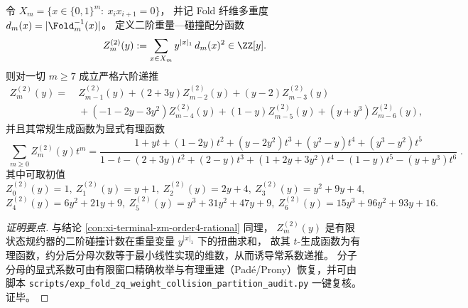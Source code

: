 
\begin{conclusion}[\texorpdfstring{$(q=2)$}{(q=2)} 的重量—碰撞配分函数：六阶常系数递推与有理生成函数]\label{con:xi-terminal-zm2-order6-rational}
令
\(
X_m=\{x\in\{0,1\}^m:\ x_ix_{i+1}=0\}
\)，
并记 Fold 纤维多重度 \(d_m(x)=|\Fold_m^{-1}(x)|\)。
定义二阶重量—碰撞配分函数
\[
Z_m^{(2)}(y):=\sum_{x\in X_m} y^{|x|_1}\,d_m(x)^2\in\ZZ[y].
\]
则对一切 \(m\ge 7\) 成立严格六阶递推
\[
\begin{aligned}
Z_m^{(2)}(y)=&\ Z_{m-1}^{(2)}(y)+(2+3y)Z_{m-2}^{(2)}(y)+(y-2)Z_{m-3}^{(2)}(y)\\
&\ +(-1-2y-3y^2)Z_{m-4}^{(2)}(y)+(1-y)Z_{m-5}^{(2)}(y)+(y+y^3)Z_{m-6}^{(2)}(y),
\end{aligned}
\]
并且其常规生成函数为显式有理函数
\[
\boxed{\;
\sum_{m\ge 0} Z_m^{(2)}(y)t^m
=\frac{1+yt+(1-2y)t^2+(y-2y^2)t^3+(y^2-y)t^4+(y^3-y^2)t^5}{1-t-(2+3y)t^2+(2-y)t^3+(1+2y+3y^2)t^4-(1-y)t^5-(y+y^3)t^6}\; }.
\]
其中可取初值
\[
Z_0^{(2)}(y)=1,\ 
Z_1^{(2)}(y)=y+1,\ 
Z_2^{(2)}(y)=2y+4,\ 
Z_3^{(2)}(y)=y^2+9y+4,
\]
\[
Z_4^{(2)}(y)=6y^2+21y+9,\ 
Z_5^{(2)}(y)=y^3+31y^2+47y+9,\ 
Z_6^{(2)}(y)=15y^3+96y^2+93y+16.
\]
\end{conclusion}
\begin{proof}[证明要点]
与结论 \ref{con:xi-terminal-zm-order4-rational} 同理，
\(Z_m^{(2)}(y)\) 是有限状态规约器的二阶碰撞计数在重量变量 \(y^{|x|_1}\) 下的扭曲求和，
故其 \(t\)-生成函数为有理函数，约分后分母次数等于最小线性实现的维数，从而诱导常系数递推。
分子分母的显式系数可由有限窗口精确枚举与有理重建（Pad\'e/Prony）恢复，并可由脚本
\texttt{scripts/exp\_fold\_zq\_weight\_collision\_partition\_audit.py} 一键复核。证毕。
\end{proof}

